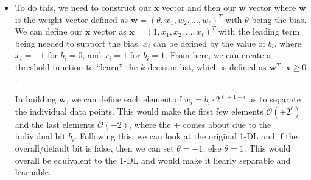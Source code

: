 \begin{enumerate}
\begin{itemize}
\item To do this, we need to construct our $\mathbf{x}$ vector and then our $\mathbf{w}$ vector where $\mathbf{w}$ is the weight vector defined as $\mathbf{w} = (\theta , w_{1}, w_{2}, \ldots , w_{\ell})^{T}$ with $\theta$ being the bias. We can define our $\mathbf{x}$ vector as $\mathbf{x} = (1, x_{1}, x_{2}, \ldots, x_{\ell})^{T}$ with the leading term being needed to support the bias. $x_{i}$ can be defined by the value of $b_{i}$, where $x_{i} = -1$ for $b_{i} = 0$, and $x_{i} = 1$ for $b_{i} = 1$. From here, we can create a threshold function to ``learn'' the $k$-decision list, which is defined as $\mathbf{w}^{T}\cdot \mathbf{x} \geq 0$.

In building $\mathbf{w}$, we can define each element of $w_{i} = b_{i}\cdot 2^{\ell+1-i}$ as to separate the individual data points. This would make the first few elements $\mathcal{O}\left(\pm 2^{\ell}\right)$ and the last elements $\mathcal{O}(\pm 2)$, where the $\pm$ comes about due to the individual bit $b_{i}$. Following this, we can look at the original 1-DL and if the overall/default bit is false, then we can set $\theta = -1$, else $\theta = 1$. This would overall be equivalent to the 1-DL and would make it liearly separable and learnable.
\end{itemize}
\end{enumerate}



